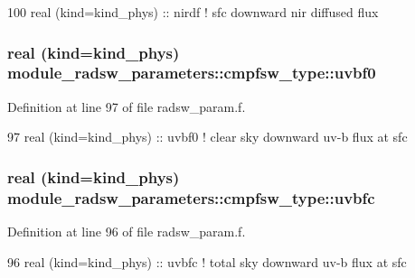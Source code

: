 \begin{DoxyCode}
100         \textcolor{keywordtype}{real (kind=kind\_phys)} :: nirdf         \textcolor{comment}{! sfc downward nir diffused flux}
\end{DoxyCode}
\subsubsection[{\texorpdfstring{uvbf0}{uvbf0}}]{\setlength{\rightskip}{0pt plus 5cm}real (kind=kind\+\_\+phys) module\+\_\+radsw\+\_\+parameters\+::cmpfsw\+\_\+type\+::uvbf0}\hypertarget{structmodule__radsw__parameters_1_1cmpfsw__type_a9e9e74c17ad3aa0a1c280f1eae513b22}{}\label{structmodule__radsw__parameters_1_1cmpfsw__type_a9e9e74c17ad3aa0a1c280f1eae513b22}


Definition at line 97 of file radsw\+\_\+param.\+f.


\begin{DoxyCode}
97         \textcolor{keywordtype}{real (kind=kind\_phys)} :: uvbf0         \textcolor{comment}{! clear sky downward uv-b flux at sfc}
\end{DoxyCode}
\subsubsection[{\texorpdfstring{uvbfc}{uvbfc}}]{\setlength{\rightskip}{0pt plus 5cm}real (kind=kind\+\_\+phys) module\+\_\+radsw\+\_\+parameters\+::cmpfsw\+\_\+type\+::uvbfc}\hypertarget{structmodule__radsw__parameters_1_1cmpfsw__type_a7b0ac40e0ceb2ce82b6b95a614542b4f}{}\label{structmodule__radsw__parameters_1_1cmpfsw__type_a7b0ac40e0ceb2ce82b6b95a614542b4f}


Definition at line 96 of file radsw\+\_\+param.\+f.


\begin{DoxyCode}
96         \textcolor{keywordtype}{real (kind=kind\_phys)} :: uvbfc         \textcolor{comment}{! total sky downward uv-b flux at sfc}
\end{DoxyCode}
